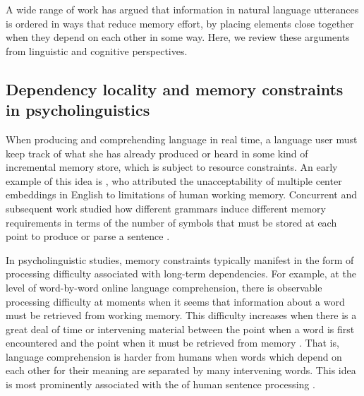 A wide range of work has argued that information in natural language utterances is ordered in ways that reduce memory effort, by placing elements close together when they depend on each other in some way. Here, we review these arguments from linguistic and cognitive perspectives.

\subsection{Dependency locality and memory constraints in psycholinguistics}

When producing and comprehending language in real time, a language user must keep track of what she has already produced or heard in some kind of incremental memory store, which is subject to resource constraints.
An early example of this idea is \citet{miller-finitary-1963}, who attributed the unacceptability of multiple center embeddings in English to limitations of human working memory.
Concurrent and subsequent work studied how different grammars induce different memory requirements in terms of the number of symbols that must be stored at each point to produce or parse a sentence \citep{yngve1960model,yngve1961depth,abney1991memory,gibson1991computational,resnik1992left}. 

In psycholinguistic studies, memory constraints typically manifest in the form of processing difficulty associated with long-term dependencies.
For example, at the level of word-by-word online language comprehension, there is observable processing difficulty at moments when it seems that information about a word must be retrieved from working memory. 
This difficulty increases when there is a great deal of time or intervening material between the point when a word is first encountered and the point when it must be retrieved from memory  \citep{gibson1998linguistic,gibson1999memory,gibson2000dependency,mcelree2000sentence,lewis-activation-based-2005,bartek-search-2011,nicenboim2015working}. 
That is, language comprehension is harder from humans when words which depend on each other for their meaning are separated by many intervening words.
This idea is most prominently associated with the  of human sentence processing \citep{gibson2000dependency}.

